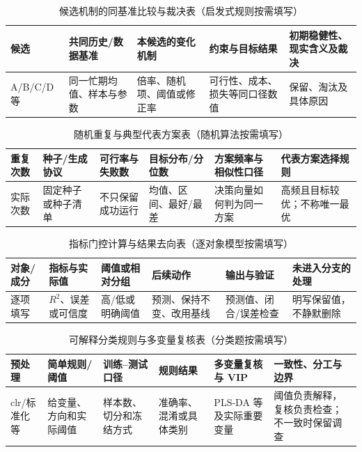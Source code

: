 \documentclass[withoutpreface,bwprint]{cumcmthesis}
\begin{document}
  \begin{table}[H]
    \centering
    \small
    \caption{候选机制的同基准比较与裁决表（启发式规则按需填写）}
    \label{tab:candidate-rule-comparison-guide}
    \begin{tabular}{p{1.45cm}p{2.55cm}p{2.6cm}p{2.45cm}p{3.65cm}}
      \toprule
      候选 & 共同历史/数据基准 & 本候选的变化机制 & 约束与目标结果 & 初期稳健性、现实含义及裁决 \\
      \midrule
      A/B/C/D 等 & 同一忙期均值、样本与参数 & 倍率、随机项、阈值或修正率 & 可行性、成本、损失等同口径数值 & 保留、淘汰及具体原因 \\
      \bottomrule
    \end{tabular}
  \end{table}
  \begin{table}[H]
    \centering
    \small
    \caption{随机重复与典型代表方案表（随机算法按需填写）}
    \label{tab:stochastic-representative-guide}
    \begin{tabular}{p{1.55cm}p{1.9cm}p{2.1cm}p{2.5cm}p{2.6cm}p{2.3cm}}
      \toprule
      重复次数 & 种子/生成协议 & 可行率与失败数 & 目标分布/分位数 & 方案频率与相似性口径 & 代表方案选择规则 \\
      \midrule
      实际次数 & 固定种子或种子清单 & 不只保留成功运行 & 均值、区间、最好/最差 & 决策向量如何判为同一方案 & 高频且目标较优；不称唯一最优 \\
      \bottomrule
    \end{tabular}
  \end{table}
  \begin{table}[H]
    \centering
    \small
    \caption{指标门控计算与结果去向表（逐对象模型按需填写）}
    \label{tab:metric-gated-computation-guide}
    \begin{tabular}{@{}p{1.7cm}p{1.8cm}p{1.7cm}p{2.35cm}p{2.25cm}p{2.35cm}@{}}
      \toprule
      对象/成分 & 指标与实际值 & 阈值或相对分组 & 后续动作 & 输出与验证 & 未进入分支的处理 \\
      \midrule
      逐项填写 & $R^2$、误差或可信度 & 高/低或明确阈值 & 预测、保持不变、改用基线 & 预测值、闭合/误差检查 & 明写保留值，不静默删除 \\
      \bottomrule
    \end{tabular}
  \end{table}
  \begin{table}[H]
    \centering
    \small
    \caption{可解释分类规则与多变量复核表（分类题按需填写）}
    \label{tab:interpretable-multivariate-confirm-guide}
    \begin{tabular}{@{}p{1.55cm}p{2.0cm}p{2.0cm}p{2.1cm}p{2.4cm}p{2.4cm}@{}}
      \toprule
      预处理 & 简单规则/阈值 & 训练--测试口径 & 规则结果 & 多变量复核与 VIP & 一致性、分工与边界 \\
      \midrule
      clr/标准化等 & 给变量、方向和实际阈值 & 样本数、切分和冻结方式 & 准确率、混淆或具体类别 & PLS-DA 等及实际重要变量 & 阈值负责解释，复核负责检查；不一致时保留调查 \\
      \bottomrule
    \end{tabular}
  \end{table}
\end{document}

